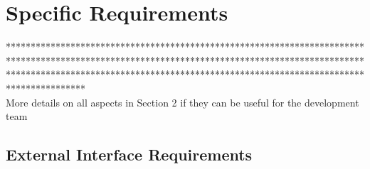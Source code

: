 %
%
\chapter{Specific Requirements}
%
\label{cap:specificrequirements}
%
%
**************************************************************************************************************************************************************************************************************************************** \\
More details on all aspects in Section 2 if they can be useful for the development team
%
\section{External Interface Requirements}
